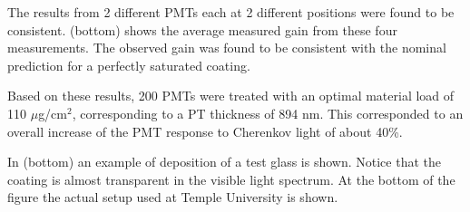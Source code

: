 The results from 2 different PMTs each at 2 different positions were found to be
consistent.  (bottom) shows the average measured gain from these four
measurements. The observed gain was found to be consistent with the nominal
prediction for a perfectly saturated coating.

Based on these results, 200 PMTs were treated \cite{Joosten:2016lcl} with an optimal material load of 110 $\mu$g/cm$^2$,
corresponding to a PT thickness of 894 nm. This corresponded to an overall
increase of the PMT response to Cherenkov light of about 40\%.

In  (bottom) an example of deposition of a test glass is shown. Notice that the coating is almost
transparent in the visible light spectrum. At the bottom of the figure the actual setup used at Temple
University is shown.






